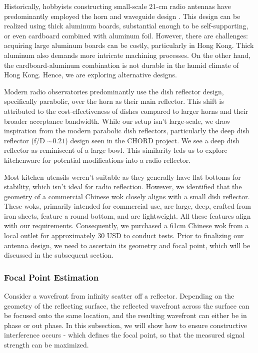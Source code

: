 \documentclass[12pt]{article}
\begin{document}
    Historically, hobbyists constructing small-scale 21-cm radio antennas have predominantly employed the horn and waveguide design \cite{amateur-radio-horn-harvard,community-project-doc,physicsOpenLab-project, amateur-radio-horn-ieee, amateur-radio-horn-india}.  
    This design can be realized using thick aluminum boards, substantial enough to be self-supporting, or even cardboard combined with aluminum foil. However, there are challenges: acquiring large aluminum boards can be costly, particularly in Hong Kong. 
    Thick aluminum also demands more intricate machining processes. On the other hand, the cardboard-aluminum combination is not durable in the humid climate of Hong Kong. Hence, we are exploring alternative designs.

    Modern radio observatories predominantly use the dish reflector design, specifically parabolic, over the horn as their main reflector. This shift is attributed to the cost-effectiveness of dishes compared to larger horns and their broader acceptance bandwidth. 
    While our setup isn't large-scale, we draw inspiration from the modern parabolic dish reflectors, particularly the deep dish reflector (f/D $\sim 0.21$) design seen in the CHORD project. \cite{chord-proposal}  
    We see a deep dish reflector as reminiscent of a large bowl. This similarity leds us to explore kitchenware for potential modifications into a radio reflector.
    
    Most kitchen utensils weren't suitable as they generally have flat bottoms for stability, which isn't ideal for radio reflection. However, we identified that the geometry of a commercial Chinese wok closely aligns with a small dish reflector. These woks, primarily intended for commercial use, are large, deep, crafted from iron sheets, feature a round bottom, and are lightweight. All these features align with our requirements. 
    Consequently, we purchased a 61cm Chinese wok from a local outlet for approximately $30$ USD to conduct tests. Prior to finalizing our antenna design, we need to ascertain its geometry and focal point, which will be discussed in the subsequent section.
    
    \subsubsection{Focal Point Estimation}
    Consider a wavefront from infinity scatter off a reflector. 
    Depending on the geometry of the reflecting surface, the reflected wavefront across the surface can be focused onto the same location, and the resulting wavefront can either be in phase or out phase.
    In this subsection, we will show how to ensure constructive interference occurs - which defines the focal point, so that the measured signal strength can be maximized.
\end{document}
